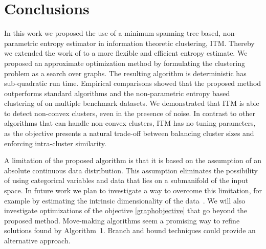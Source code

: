 \section{Conclusions}
In this work we proposed the use of a minimum spanning tree based,
non-parametric entropy estimator in information theoretic clustering, ITM\@.
Thereby we extended the work of \citet{faivishevsky2010nonparametric} to a more
flexible and efficient entropy estimate.  We proposed an approximate optimization
method by formulating the clustering problem as a search over graphs.
The resulting algorithm is deterministic has sub-quadratic run time.
%
Empirical comparisons showed that the proposed method outperforms standard
algorithms and the non-parametric entropy based clustering of
\citep{faivishevsky2010nonparametric} on multiple benchmark datasets. We
demonstrated that ITM is able to detect non-convex clusters,
even in the presence of noise.
%
In contrast to other algorithms that can handle non-convex clusters, ITM has no
tuning parameters, as the objective presents a natural trade-off between
balancing cluster sizes and enforcing intra-cluster similarity.

A limitation of the proposed algorithm is that it is based on the assumption 
of an absolute continuous data distribution. This assumption eliminates the 
possibility of using categorical variables and data that lies on a submanifold 
of the input space. 
%
In future work we plan to investigate a way to overcome this limitation, 
for example by estimating the intrinsic dimensionality of the 
data~\citep{pettis1979intrinsic}.
%
We will also investigate optimizations of the objective 
\eqref{graphobjective} that go beyond the proposed method. 
Move-making algorithms seem a promising way to refine solutions 
found by Algorithm~1. Branch and bound techniques could provide 
an alternative approach. 


